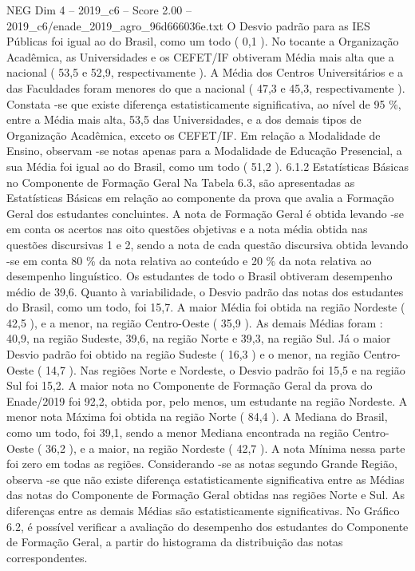 \begin{textsample}{NEG Dim 4 – 2019\_c6 – Score 2.00 – 2019\_c6/enade\_2019\_agro\_96d666036e.txt}
O Desvio padrão para as IES Públicas foi igual ao do Brasil, como um todo ( 0,1 ).
No tocante a Organização Acadêmica, as Universidades e os CEFET/IF obtiveram Média mais alta que a nacional ( 53,5 e 52,9, respectivamente ).
A Média dos Centros Universitários e a das Faculdades foram menores do que a nacional ( 47,3 e 45,3, respectivamente ).
Constata -se que existe diferença estatisticamente significativa, ao nível de 95 \%, entre a Média mais alta, 53,5 das Universidades, e a dos demais tipos de Organização Acadêmica, exceto os CEFET/IF.
Em relação a Modalidade de Ensino, observam -se notas apenas para a Modalidade de Educação Presencial, a sua Média foi igual ao do Brasil, como um todo ( 51,2 ). 6.1.2 Estatísticas Básicas no Componente de Formação Geral Na Tabela 6.3, são apresentadas as Estatísticas Básicas em relação ao componente da prova que avalia a Formação Geral dos estudantes concluintes.
A nota de Formação Geral é obtida levando -se em conta os acertos nas oito questões objetivas e a nota média obtida nas questões discursivas 1 e 2, sendo a nota de cada questão discursiva obtida levando -se em conta 80 \% da nota relativa ao conteúdo e 20 \% da nota relativa ao desempenho linguístico.
Os estudantes de todo o Brasil obtiveram desempenho médio de 39,6.
Quanto à variabilidade, o Desvio padrão das notas dos estudantes do Brasil, como um todo, foi 15,7.
A maior Média foi obtida na região Nordeste ( 42,5 ), e a menor, na região Centro-Oeste ( 35,9 ).
As demais Médias foram : 40,9, na região Sudeste, 39,6, na região Norte e 39,3, na região Sul.
Já o maior Desvio padrão foi obtido na região Sudeste ( 16,3 ) e o menor, na região Centro-Oeste ( 14,7 ).
Nas regiões Norte e Nordeste, o Desvio padrão foi 15,5 e na região Sul foi 15,2.
A maior nota no Componente de Formação Geral da prova do Enade/2019 foi 92,2, obtida por, pelo menos, um estudante na região Nordeste.
A menor nota Máxima foi obtida na região Norte ( 84,4 ).
A Mediana do Brasil, como um todo, foi 39,1, sendo a menor Mediana encontrada na região Centro-Oeste ( 36,2 ), e a maior, na região Nordeste ( 42,7 ).
A nota Mínima nessa parte foi zero em todas as regiões.
Considerando -se as notas segundo Grande Região, observa -se que não existe diferença estatisticamente significativa entre as Médias das notas do Componente de Formação Geral obtidas nas regiões Norte e Sul.
As diferenças entre as demais Médias são estatisticamente significativas.
No Gráfico 6.2, é possível verificar a avaliação do desempenho dos estudantes do Componente de Formação Geral, a partir do histograma da distribuição das notas correspondentes.

\end{textsample}
